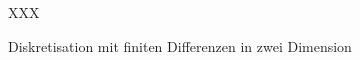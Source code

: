 %
%
%
\begin{figure}
\centering
\vspace*{2cm}
XXX
\vspace*{2cm}
\caption{Diskretisation mit finiten Differenzen in zwei Dimension
\label{buch:pdenumerik:fdm:fig:2d}}
\end{figure}
